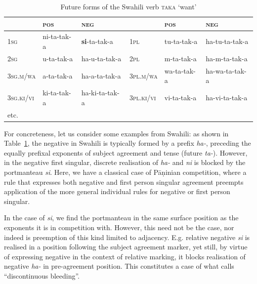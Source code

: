 \documentclass[output=paper
                ,modfonts
                ,nonflat
	        ,collection
	        ,collectionchapter
	        ,collectiontoclongg
 	        ,biblatex
                ,babelshorthands
                ,newtxmath
                ,draftmode
                ,colorlinks, citecolor=brown
] {langscibook}
\begin{document}
{%

\begin{table}
\setlength{\tabcolsep}{.3em}
\centering
\begin{tabular}{llllll}
\toprule 
 & \textsc{pos} & \textsc{neg}     &             & \textsc{pos} & \textsc{neg}\\
\midrule 
\textsc{1sg} & ni-{ta}-tak-{a} & \textbf{{si}}-{ta}-tak-{a}        & \textsc{1pl} & tu-{ta}-tak-{a}     & {ha}-tu-{ta}-tak-{a}\\
\textsc{2sg} & u-{ta}-tak-{a} & {ha}-u-{ta}-tak-{a}        & \textsc{2pl} & m-{ta}-tak-{a}      & {ha}-m-{ta}-tak-{a}\\
\textsc{3sg.m/wa} & a-{ta}-tak-{a} & {ha}-a-{ta}-tak-{a}    & \textsc{3pl.m/wa} & wa-{ta}-tak-{a} & {ha}-wa-{ta}-tak-{a}\\ 
\textsc{3sg.ki/vi} & ki-{ta}-tak-{a} & {ha}-ki-{ta}-tak-{a} & \textsc{3pl.ki/vi} & vi-{ta}-tak-{a} & {ha}-vi-{ta}-tak-{a}\\
etc. & &\\
\bottomrule
\end{tabular}
\caption{Future forms of the Swahili verb  \textsc{taka} ‘want’}
\label{tab:SwahiliPortmanteau}
\end{table}

For concreteness, let us consider some examples from Swahili: as shown
in Table~\ref{tab:SwahiliPortmanteau}, the negative in Swahili is
typically formed by a prefix \textit{ha-}, preceding the equally
prefixal exponents of
subject agreement and tense (future \textit{ta-}). However, in the
negative first singular, discrete realisation of \textit{ha-} and
\textit{ni} is blocked by the portmanteau \textit{si}. Here, we have
a classical case of   Pāṇinian competition, where a rule that
expresses both negative and first person singular agreement preempts
application of the more general individual rules for negative or first
person singular.  



In the case of \textit{si}, we find the portmanteau in the same
surface position as the exponents it is in competition with.  However,
this need not be the case, nor indeed is preemption of this kind
limited to adjacency. E.g.  relative negative \textit{si} is realised
in a position following the subject agreement marker, yet still, by
virtue of expressing negative in the context of relative marking, it
blocks realisation of negative \textit{ha-} in pre-agreement position. This constitutes a case of what \citet{Noyer92} calls ``discontinuous
bleeding''. 

}
\end{document}
